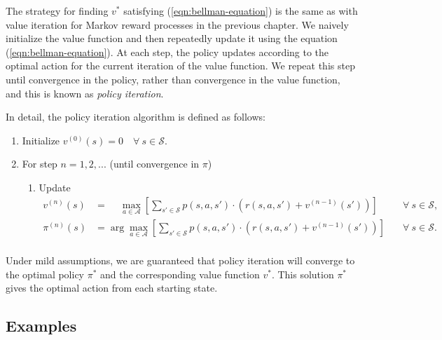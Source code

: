 \documentclass{article}
\begin{document}
        The strategy for finding $v^*$ satisfying (\ref{eqn:bellman-equation}) is the same as with value iteration for Markov reward processes in the previous chapter. We naively initialize the value function and then repeatedly update it using the equation (\ref{eqn:bellman-equation}). At each step, the policy updates according to the optimal action for the current iteration of the value function. We repeat this step until convergence in the policy, rather than convergence in the value function, and this is known as {\it policy iteration}.
        
        In detail, the policy iteration algorithm is defined as follows:
        \begin{enumerate}
          \item Initialize $v^{(0)}(s) = 0 \quad \forall~s\in\mathcal S$.
          \item For step $n = 1, 2, ...$ (until convergence in $\pi$)
          \begin{enumerate}
            \item Update
              \begin{align*}
                v^{(n)}(s)  &= \quad~\max_{a \in \mathcal{A}}\left[\sum_{s' \in \mathcal{S}} p(s, a, s') \cdot \left(r(s, a, s') + v^{(n-1)}(s')\right)\right] \quad &\forall~s \in \mathcal{S},\\
                \pi^{(n)}(s)  &= \arg\max_{a \in \mathcal{A}}\left[\sum_{s' \in \mathcal{S}} p(s, a, s') \cdot \left(r(s, a, s') + v^{(n-1)}(s')\right)\right] \quad &\forall~s \in \mathcal{S}.\\
              \end{align*}
          \end{enumerate}
        \end{enumerate}

      Under mild assumptions, we are guaranteed that policy iteration will converge to the optimal policy $\pi^*$ and the corresponding value function $v^*$. This solution $\pi^*$ gives the optimal action from each starting state.

    \subsection{\sc Examples}
\end{document}
